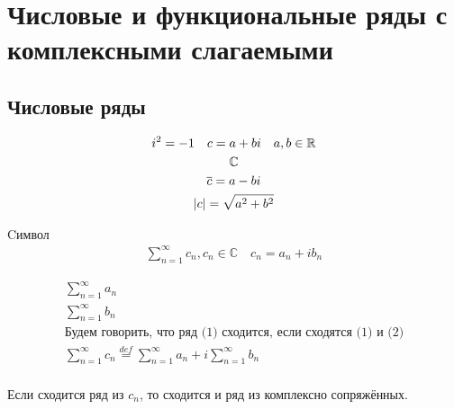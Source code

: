 \documentclass[main]{subfiles}
\begin{document}
\chapter{Числовые и функциональные ряды с комплексными слагаемыми}
\section*{Числовые ряды}
\begin{gather*}
    i^2 = -1 \quad c = a + bi \quad a,b \in \mathbb{R} \\
    \mathbb{C}\\
    \overline{c} = a -bi \\
    |c| = \sqrt{a^2 + b^2}
\end{gather*}
\begin{definition}
     Cимвол \begin{gather*}
        \sum_{n=1}^\infty c_n , c_n \in \mathbb{C} \quad c_n = a_n + ib_n \tag{1}
    \end{gather*}
\end{definition}

\begin{definition}[Сходимость]
    \begin{gather*}
    \sum^\infty_{n=1} a_n \tag{2}\\
    \sum^\infty_{n=1} b_n \tag{3}\\
    \text{Будем говорить, что ряд (1) сходится, если сходятся (1) и (2)} \\
    \sum^\infty_{n=1} c_n \stackrel{def}{=} \sum^\infty_{n=1} a_n + i \sum^\infty_{n=1} b_n \tag{4}\\
    \end{gather*}
\end{definition}
Если сходится ряд из $c_n$, то сходится и ряд из комплексно сопряжённых. 
\end{document}

